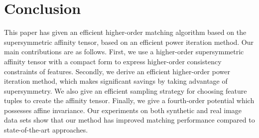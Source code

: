 \section{Conclusion}
\label{sec:conclusion}

This paper has given an efficient higher-order matching algorithm based on the supersymmetric affinity tensor, based on an efficient power iteration method. Our main contributions are as follows.
First, we use a  higher-order supersymmetric affinity tensor with a compact form to express higher-order consistency constraints of features. Secondly, we derive an efficient higher-order power iteration method, which makes significant savings by taking advantage of supersymmetry. We also give an efficient sampling strategy for choosing feature tuples to create the affinity tensor. Finally, we give a fourth-order potential which possesses affine invariance. Our experiments on both synthetic and real image data sets show that our method has improved matching performance compared to state-of-the-art approaches.

\appendix
